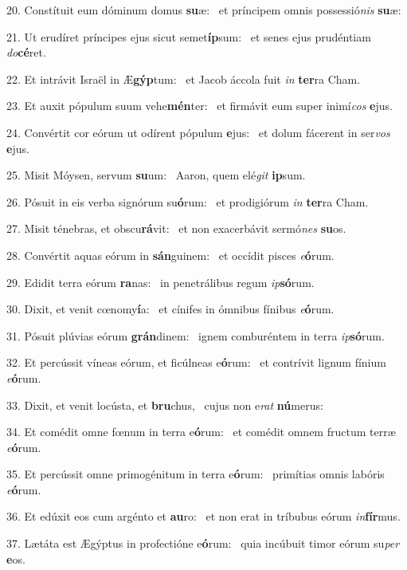 20. Constítuit eum dóminum domus \textbf{su}æ: \ast\  et príncipem omnis possessió\textit{nis} \textbf{su}æ:\

21. Ut erudíret príncipes ejus sicut semet\textbf{íp}sum: \ast\  et senes ejus prudéntiam \textit{do}\textbf{cé}ret.\

22. Et intrávit Israël in Æ\textbf{gýp}tum: \ast\  et Jacob áccola fuit \textit{in} \textbf{ter}ra Cham.\

23. Et auxit pópulum suum vehe\textbf{mén}ter: \ast\  et firmávit eum super inimí\textit{cos} \textbf{e}jus.\

24. Convértit cor eórum ut odírent pópulum \textbf{e}jus: \ast\  et dolum fácerent in ser\textit{vos} \textbf{e}jus.\

25. Misit Móysen, servum \textbf{su}um: \ast\  Aaron, quem elé\textit{git} \textbf{ip}sum.\

26. Pósuit in eis verba signórum su\textbf{ó}rum: \ast\  et prodigiórum \textit{in} \textbf{ter}ra Cham.\

27. Misit ténebras, et obscu\textbf{rá}vit: \ast\  et non exacerbávit sermó\textit{nes} \textbf{su}os.\

28. Convértit aquas eórum in \textbf{sán}guinem: \ast\  et occídit pisces \textit{e}\textbf{ó}rum.\

29. Edidit terra eórum \textbf{ra}nas: \ast\  in penetrálibus regum \textit{ip}\textbf{só}rum.\

30. Dixit, et venit cœnomy\textbf{í}a: \ast\  et cínifes in ómnibus fínibus \textit{e}\textbf{ó}rum.\

31. Pósuit plúvias eórum \textbf{grán}dinem: \ast\  ignem comburéntem in terra \textit{ip}\textbf{só}rum.\

32. Et percússit víneas eórum, et ficúlneas e\textbf{ó}rum: \ast\  et contrívit lignum fínium \textit{e}\textbf{ó}rum.\

33. Dixit, et venit locústa, et \textbf{bru}chus, \ast\  cujus non e\textit{rat} \textbf{nú}merus:\

34. Et comédit omne fœnum in terra e\textbf{ó}rum: \ast\  et comédit omnem fructum terræ \textit{e}\textbf{ó}rum.\

35. Et percússit omne primogénitum in terra e\textbf{ó}rum: \ast\  primítias omnis labóris \textit{e}\textbf{ó}rum.\

36. Et edúxit eos cum argénto et \textbf{au}ro: \ast\  et non erat in tríbubus eórum \textit{in}\textbf{fír}mus.\

37. Lætáta est Ægýptus in profectióne e\textbf{ó}rum: \ast\  quia incúbuit timor eórum su\textit{per} \textbf{e}os.\

